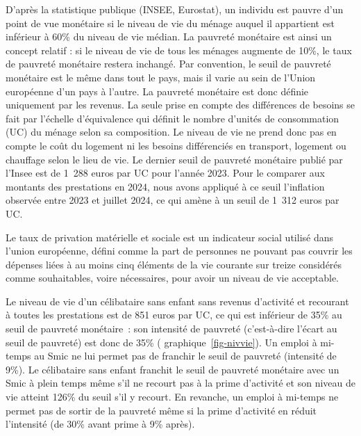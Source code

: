 \documentclass[
  french,
]{article}
\newcounter{quartocallouttipno}
\newcommand{\quartocallouttip}[1]{\refstepcounter{quartocallouttipno}\label{#1}}
\begin{document}
\begin{tcolorbox}[enhanced jigsaw, arc=.35mm, bottomrule=.15mm, bottomtitle=1mm, breakable, colback=white, colbacktitle=quarto-callout-tip-color!10!white, colframe=quarto-callout-tip-color-frame, coltitle=black, left=2mm, leftrule=.75mm, opacityback=0, opacitybacktitle=0.6, rightrule=.15mm, title={Astuce \ref*{tip-tpm}. La pauvreté monétaire et les privations matérielles et sociales}, titlerule=0mm, toprule=.15mm, toptitle=1mm]

\quartocallouttip{tip-tpm} 

D'après la statistique publique (INSEE, Eurostat), un individu est
pauvre d'un point de vue monétaire si le niveau de vie du ménage auquel
il appartient est inférieur à 60\% du niveau de vie médian. La pauvreté
monétaire est ainsi un concept relatif : si le niveau de vie de tous les
ménages augmente de 10\%, le taux de pauvreté monétaire restera
inchangé. Par convention, le seuil de pauvreté monétaire est le même
dans tout le pays, mais il varie au sein de l'Union européenne d'un pays
à l'autre. La pauvreté monétaire est donc définie uniquement par les
revenus. La seule prise en compte des différences de besoins se fait par
l'échelle d'équivalence qui définit le nombre d'unités de consommation
(UC) du ménage selon sa composition. Le niveau de vie ne prend donc pas
en compte le coût du logement ni les besoins différenciés en transport,
logement ou chauffage selon le lieu de vie. Le dernier seuil de pauvreté
monétaire publié par l'Insee est de 1~288 euros par UC pour l'année
2023. Pour le comparer aux montants des prestations en 2024, nous avons
appliqué à ce seuil l'inflation observée entre 2023 et juillet 2024, ce
qui amène à un seuil de 1~312 euros par UC.

Le taux de privation matérielle et sociale est un indicateur social
utilisé dans l'union européenne, défini comme la part de personnes ne
pouvant pas couvrir les dépenses liées à au moins cinq éléments de la
vie courante sur treize considérés comme souhaitables, voire
nécessaires, pour avoir un niveau de vie acceptable.

\end{tcolorbox}

Le niveau de vie d'un célibataire sans enfant sans revenus d'activité et
recourant à toutes les prestations est de 851 euros par UC, ce qui est
inférieur de 35\% au seuil de pauvreté monétaire~: son intensité de
pauvreté (c'est-à-dire l'écart au seuil de pauvreté) est donc de 35\% (
graphique~\ref{fig-nivvie}). Un emploi à mi-temps au Smic ne lui permet
pas de franchir le seuil de pauvreté (intensité de 9\%). Le célibataire
sans enfant franchit le seuil de pauvreté monétaire avec un Smic à plein
temps même s'il ne recourt pas à la prime d'activité et son niveau de
vie atteint 126\% du seuil s'il y recourt. En revanche, un emploi à
mi-temps ne permet pas de sortir de la pauvreté même si la prime
d'activité en réduit l'intensité (de 30\% avant prime à 9\% après).
\end{document}
